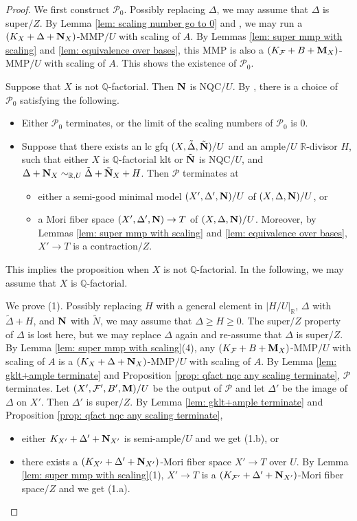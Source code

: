 \documentclass[11pt]{amsart}
\numberwithin{equation}{section}
\newcommand{\Mm}{{\bf{M}}}
\newcommand{\Nn}{{\bf{N}}}
\newcommand{\Qq}{\mathbb{Q}}
\newcommand{\Rr}{\mathbb{R}}
\newcommand{\Ff}{\mathcal{F}}
\theoremstyle{definition}
\theoremstyle{definition}
\theoremstyle{definition}
\begin{document}
\begin{proof}
We first construct $\mathcal{P}_0$. Possibly replacing $\Delta$, we may assume that $\Delta$ is super$/Z$. By Lemma \ref{lem: scaling number go to 0} and \cite[Lemma 2.17]{TX23}, we may run a $(K_X+\Delta+\Nn_X)$-MMP$/U$ with scaling of $A$. By Lemmas \ref{lem: super mmp with scaling} and \ref{lem: equivalence over bases}, this MMP is also a $(K_{\Ff}+B+\Mm_{X})$-MMP$/U$ with scaling of $A$. This shows the existence of $\mathcal{P}_0$. 

Suppose that $X$ is not $\Qq$-factorial. Then $\Nn$ is NQC$/U$. By \cite[Theorem A, Theorem F, Lemma 4.3]{TX23}, there is a choice of $\mathcal{P}_0$ satisfying the following.
\begin{itemize}
    \item Either $\mathcal{P}_0$ terminates, or the limit of the scaling numbers of $\mathcal{P}_0$ is $0$.
    \item Suppose that there exists an lc gfq $(X,\tilde\Delta,\tilde\Nn)/U$ and an ample$/U$ $\Rr$-divisor $H$, such that either $X$ is $\Qq$-factorial klt or $\tilde\Nn$ is NQC$/U$, and $\Delta+\Nn_X\sim_{\mathbb R,U}\tilde\Delta+\tilde\Nn_X+H$. Then $\mathcal{P}$ terminates at
    \begin{itemize}
        \item either a semi-good minimal model $(X',\Delta',\Nn)/U$ of $(X,\Delta,\Nn)/U$, or
        \item a Mori fiber space $(X',\Delta',\Nn)\rightarrow T$ of $(X,\Delta,\Nn)/U$. Moreover, by Lemmas \ref{lem: super mmp with scaling} and \ref{lem: equivalence over bases}, $X'\rightarrow T$ is a contraction$/Z$. 
    \end{itemize}
\end{itemize}
This implies the proposition when $X$ is not $\Qq$-factorial. In the following, we may assume that $X$ is $\Qq$-factorial. 

We prove (1). Possibly replacing $H$ with a general element in $|H/U|_{\mathbb R}$, $\Delta$ with $\tilde\Delta+H$, and $\Nn$ with $\tilde N$, we may assume that $\Delta\geq H\geq 0$. The super$/Z$ property of $\Delta$ is lost here, but we may replace $\Delta$ again and re-assume that $\Delta$ is super$/Z$. By Lemma \ref{lem: super mmp with scaling}(4), any $(K_{\Ff}+B+\Mm_X)$-MMP$/U$ with scaling of $A$ is a $(K_X+\Delta+\Nn_X)$-MMP$/U$ with scaling of $A$. By Lemma \ref{lem: gklt+ample terminate} and Proposition \ref{prop: qfact nqc any scaling terminate}, $\mathcal{P}$ terminates. Let $(X',\Ff',B',\Mm)/U$ be the output of $\mathcal{P}$ and let $\Delta'$ be the image of $\Delta$ on $X'$. Then $\Delta'$ is super$/Z$. By Lemma \ref{lem: gklt+ample terminate} and Proposition \ref{prop: qfact nqc any scaling terminate}, 
\begin{itemize}
    \item either $K_{X'}+\Delta'+\Nn_{X'}$ is semi-ample$/U$ and we get (1.b), or
    \item there exists a $(K_{X'}+\Delta'+\Nn_{X'})$-Mori fiber space $X'\rightarrow T$ over $U$. By Lemma \ref{lem: super mmp with scaling}(1), $X'\rightarrow T$ is a $(K_{\Ff'}+\Delta'+\Nn_{X'})$-Mori fiber space$/Z$  and we get (1.a).
\end{itemize}


\end{proof}
\end{document}
